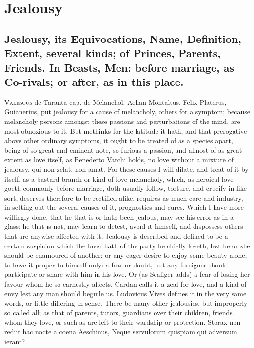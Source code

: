 \chapter{Jealousy}
{

\section[Jealousy, its Equivocations, Name, Definition\ldots{}]{Jealousy, its Equivocations, Name, Definition, Extent, several kinds; of Princes, Parents, Friends. In Beasts, Men: before marriage, as Co-rivals; or after, as in this place.}

\lettrine{V}{alescus} de Taranta cap. de Melanchol. Aelian Montaltus, Felix
Platerus, Guianerius, put jealousy for a cause of melancholy, others
for a symptom; because melancholy persons amongst these passions and
perturbations of the mind, are most obnoxious to it. But methinks for
the latitude it hath, and that prerogative above other ordinary
symptoms, it ought to be treated of as a species apart, being of so
great and eminent note, so furious a passion, and almost of as great
extent as love itself, as Benedetto Varchi holds, no love without
a mixture of jealousy, qui non zelat, non amat. For these causes I will
dilate, and treat of it by itself, as a bastard-branch or kind of
love-melancholy, which, as heroical love goeth commonly before
marriage, doth usually follow, torture, and crucify in like sort,
deserves therefore to be rectified alike, requires as much care and
industry, in setting out the several causes of it, prognostics and
cures. Which I have more willingly done, that he that is or hath been
jealous, may see his error as in a glass; he that is not, may learn to
detest, avoid it himself, and dispossess others that are anywise
affected with it.
Jealousy is described and defined to be a certain suspicion which
the lover hath of the party he chiefly loveth, lest he or she should be
enamoured of another: or any eager desire to enjoy some beauty alone,
to have it proper to himself only: a fear or doubt, lest any foreigner
should participate or share with him in his love. Or (as Scaliger
adds) a fear of losing her favour whom he so earnestly affects. Cardan
calls it a zeal for love, and a kind of envy lest any man should
beguile us. Ludovicus Vives defines it in the very same words, or
little differing in sense.
There be many other jealousies, but improperly so called all; as that
of parents, tutors, guardians over their children, friends whom they
love, or such as are left to their wardship or protection.
Storax non rediit hac nocte a coena Aeschinus,
Neque servulorum quispiam qui adversum ierant?

}
